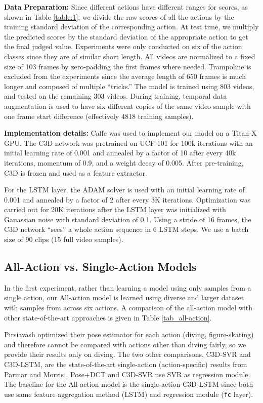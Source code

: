 \documentclass[10pt,twocolumn,letterpaper]{article}
\begin{document}
\textbf{Data Preparation:} Since different actions have different ranges for scores, as shown in Table \ref{table:1}, we divide the raw scores of all the actions by the training standard deviation of the corresponding action. At test time, we multiply the predicted scores by the standard deviation of the appropriate action to get the final judged value.  Experiments were only conducted on six of the action classes since they are of similar short length.  All videos are normalized to a fixed size of 103 frames by zero-padding the first frames where needed. Trampoline is excluded from the experiments since the average length of 650 frames is much longer and composed of multiple ``tricks.''  The model is trained using 803 videos, and tested on the remaining 303 videos. During training, temporal data augmentation is used to have six different copies of the same video sample with one frame start difference (effectively 4818 training samples).

\textbf{Implementation details:} Caffe\cite{caffe} was used to implement our model on a Titan-X GPU. The C3D network was pretrained on UCF-101 \cite{ucf101} for 100k iterations with an initial learning rate of 0.001 and annealed by a factor of 10 after every 40k iterations, momentum of 0.9, and a weight decay of 0.005. After pre-training, C3D is frozen and used as a feature extractor.

For the LSTM layer, the ADAM solver \cite{adam} is used with an initial learning rate of 0.001 and annealed by a factor of 2 after every 3K iterations. Optimization was carried out for 20K iterations after the LSTM layer was initialized with Gauassian noise with standard deviation of 0.1. Using a stride of 16 frames, the C3D network ``sees'' a whole action sequence in 6 LSTM steps. We use a batch size of 90 clips (15 full video samples).
\subsection{All-Action vs. Single-Action Models}
\label{exp_1} 
In the first experiment, rather than learning a model using only samples from a single action, our All-action model is learned using diverse and larger dataset with samples from across six actions.  A comparison of the all-action model with other state-of-the-art approaches is given in Table \ref{tab_all-action}.    

Pirsiavash \etal \cite{pirsia} optimized their pose estimator for each action (diving, figure-skating) and therefore cannot be compared with actions other than diving fairly, so we provide their results only on diving. The two other comparisons, C3D-SVR and C3D-LSTM, are the state-of-the-art single-action (action-specific) results from Parmar and Morris \cite{parmar}. Pose+DCT \cite{pirsia} and C3D-SVR \cite{parmar} use SVR as regression module. The baseline for the All-action model is the single-action C3D-LSTM since both use same feature aggregation method (LSTM) and regression module (\texttt{fc} layer). 
\end{document}
